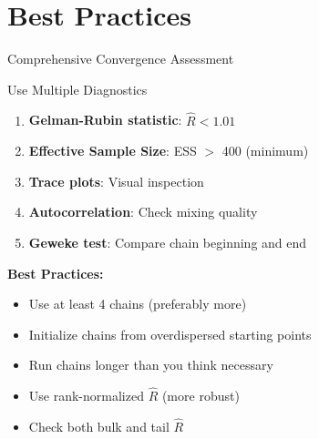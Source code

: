 \section{Best Practices}

\begin{frame}{Comprehensive Convergence Assessment}
	\begin{block}{Use Multiple Diagnostics}
		\begin{enumerate}
			\item \textbf{Gelman-Rubin statistic}: $\hat{R} < 1.01$
			\item \textbf{Effective Sample Size}: ESS $>$ 400 (minimum)
			\item \textbf{Trace plots}: Visual inspection
			\item \textbf{Autocorrelation}: Check mixing quality
			\item \textbf{Geweke test}: Compare chain beginning and end
		\end{enumerate}
	\end{block}

	\vspace{0.5cm}
	\textbf{Best Practices:}
	\begin{itemize}
		\item Use at least 4 chains (preferably more)
		\item Initialize chains from overdispersed starting points
		\item Run chains longer than you think necessary
		\item Use rank-normalized $\hat{R}$ (more robust)
		\item Check both bulk and tail $\hat{R}$
	\end{itemize}
\end{frame}

